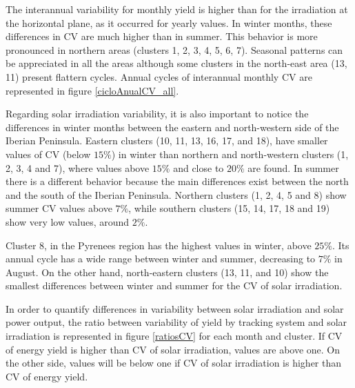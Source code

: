 The interannual variability for monthly yield is higher than for the irradiation at the horizontal plane, as it occurred for yearly values. In winter months, these differences in CV are much higher than in summer. This behavior is more pronounced in northern areas (clusters 1, 2, 3, 4, 5, 6, 7).  Seasonal patterns can be appreciated in all the areas although some clusters in the north-east area (13, 11) present flattern cycles. Annual cycles of interannual monthly CV are represented in figure \ref{cicloAnualCV_all}.

Regarding solar irradiation variability, it is also important to notice the differences in winter months between the eastern and north-western side of the Iberian Peninsula. Eastern clusters (10, 11, 13, 16, 17, and 18), have smaller values of CV (below $15\%$) in winter than northern and north-western clusters (1, 2, 3, 4 and 7), where values above $15\%$ and close to $20\%$ are found. In summer there is a different behavior because the main differences exist between the north and the south of the Iberian Peninsula. Northern clusters (1, 2, 4, 5 and 8) show summer CV values above $7\%$, while southern clusters (15, 14, 17, 18 and 19) show very low values, around $2\%$.

Cluster 8, in the Pyrenees region has the highest values in winter, above $25\%$. Its annual cycle has a wide range between winter and summer, decreasing to $7\%$ in August. On the other hand, north-eastern clusters (13, 11, and 10) show the smallest differences between winter and summer for the CV of solar irradiation.

In order to quantify differences in variability between solar irradiation and solar power output, the ratio between variability of yield by tracking system and solar irradiation is represented in figure \ref{ratiosCV} for each month and cluster. If CV of energy yield is higher than CV of solar irradiation, values are above one. On the other side, values will be below one if CV of solar irradiation is higher than CV of energy yield. 

